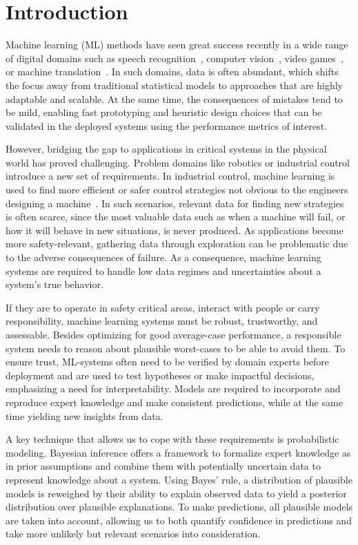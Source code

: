 \chapter{Introduction}
\label{toc:introduction}

Machine learning (ML) methods have seen great success recently in a wide range of digital domains such as speech recognition~\parencite{chorowski_attention-based_2015}, computer vision~\parencite{russakovsky_imagenet_2015}, video games~\parencite{berner_dota_2019}, or machine translation~\parencite{johnson_googles_2017}.
In such domains, data is often abundant, which shifts the focus away from traditional statistical models to approaches that are highly adaptable and scalable.
At the same time, the consequences of mistakes tend to be mild, enabling fast prototyping and heuristic design choices that can be validated in the deployed systems using the performance metrics of interest.

However, bridging the gap to applications in critical systems in the physical world has proved challenging.
Problem domains like robotics or industrial control introduce a new set of requirements.
In industrial control, machine learning is used to find more efficient or safer control strategies not obvious to the engineers designing a machine~\parencite{hein_benchmark_2017}.
In such scenarios, relevant data for finding new strategies is often scarce, since the most valuable data such as when a machine will fail, or how it will behave in new situations, is never produced.
As applications become more safety-relevant, gathering data through exploration can be problematic due to the adverse consequences of failure.
As a consequence, machine learning systems are required to handle low data regimes and uncertainties about a system's true behavior.

If they are to operate in safety critical areas, interact with people or carry responsibility, machine learning systems must be robust, trustworthy, and assessable.
Besides optimizing for good average-case performance, a responsible system needs to reason about plausible worst-cases to be able to avoid them.
To ensure trust, ML-systems often need to be verified by domain experts before deployment and are used to test hypotheses or make impactful decisions, emphasizing a need for interpretability.
Models are required to incorporate and reproduce expert knowledge and make consistent predictions, while at the same time yielding new insights from data.

A key technique that allows us to cope with these requirements is probabilistic modeling.
Bayesian inference offers a framework to formalize expert knowledge as in prior assumptions and combine them with potentially uncertain data to represent knowledge about a system.
Using Bayes' rule, a distribution of plausible models is reweighed by their ability to explain observed data to yield a posterior distribution over plausible explanations.
To make predictions, all plausible models are taken into account, allowing us to both quantify confidence in predictions and take more unlikely but relevant scenarios into consideration.

